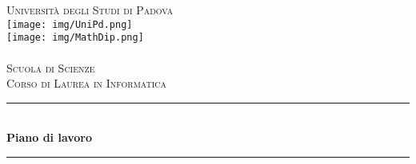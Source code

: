 \begin{titlepage}
    
    \newcommand{\HRule}{\rule{\linewidth}{0.5mm}} 
    
    \center
    
    
    \textsc{\LARGE Università degli Studi di Padova}\\[1cm] 
    
    
    \texttt{[image: img/UniPd.png]}\\[1cm]
    
    \texttt{[image: img/MathDip.png]}\\
    \textsc{\dipartimento}\\[1.2cm]
    \textsc{\Large Scuola di Scienze}\\[0.5cm] 
    
    \textsc{\large Corso di Laurea in Informatica}\\[0.5cm] 
    
    \vspace{2.5cm}
    
    
    \HRule \\[0.4cm]
    { \huge \bfseries Piano di lavoro}\\[0.4cm] %
    \HRule \\[1cm]
    
    

\end{titlepage}
